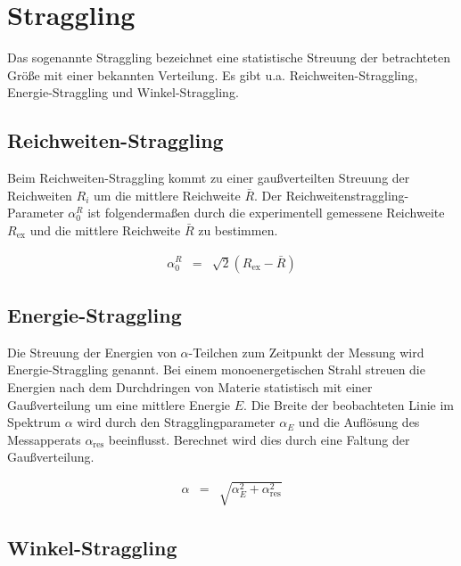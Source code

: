 \documentclass[12pt,a4paper]{scrartcl}
\numberwithin{equation}{section} %
\renewcommand{\[}{} %
\renewcommand{\]}{\noindent} %
\begin{document}
\hypertarget{straggling}{%
\section{Straggling}\label{straggling}}

Das sogenannte Straggling bezeichnet eine statistische Streuung der
betrachteten Größe mit einer bekannten Verteilung. Es gibt u.a.
Reichweiten-Straggling, Energie-Straggling und Winkel-Straggling.

\hypertarget{reichweiten-straggling}{%
\subsection{Reichweiten-Straggling}\label{reichweiten-straggling}}

Beim Reichweiten-Straggling kommt zu einer gaußverteilten Streuung der
Reichweiten $R_i$ um die mittlere Reichweite $\bar{R}$. Der
Reichweitenstraggling-Parameter $\alpha^R_0$ ist folgendermaßen durch
die experimentell gemessene Reichweite $R_\mathrm{ex}$ und die
mittlere Reichweite $\bar{R}$ zu bestimmen.

\[
\begin{eqnarray}
        \alpha^R_0 &=& \sqrt{2}\left(R_\mathrm{ex}-\bar{R}\right)
\end{eqnarray}
\]

\hypertarget{energie-straggling}{%
\subsection{Energie-Straggling}\label{energie-straggling}}

Die Streuung der Energien von $\alpha$-Teilchen zum Zeitpunkt der
Messung wird Energie-Straggling genannt. Bei einem monoenergetischen
Strahl streuen die Energien nach dem Durchdringen von Materie
statistisch mit einer Gaußverteilung um eine mittlere Energie $E$. Die
Breite der beobachteten Linie im Spektrum $\alpha$ wird durch den
Stragglingparameter $\alpha_E$ und die Auflösung des Messapperats
$\alpha_\mathrm{res}$ beeinflusst. Berechnet wird dies durch eine
Faltung der Gaußverteilung.

\[
\begin{eqnarray}
        \alpha &=& \sqrt{\alpha_E^2 + \alpha_\mathrm{res}^2}
\end{eqnarray}
\]

\hypertarget{winkel-straggling}{%
\subsection{Winkel-Straggling}\label{winkel-straggling}}
\end{document}
